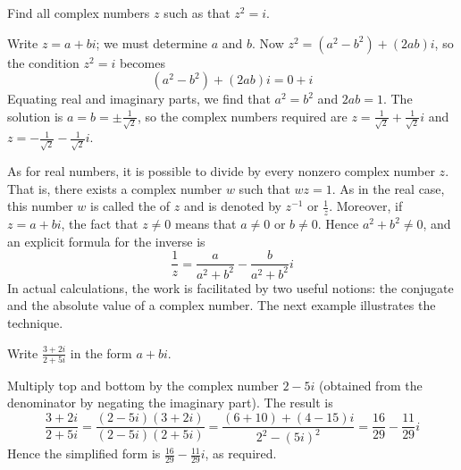 \documentclass{ximera}
\begin{document}
\begin{example}\label{ex:033872}
Find all complex numbers $z$ such as that $z^{2} = i$.

\begin{explanation}
  Write $z = a + bi$; we must determine $a$ and $b$. Now $z^{2} = (a^{2} - b^{2}) + (2ab)i$, so the condition $z^{2} = i$ becomes
\begin{equation*}
(a^2 - b^2) + (2ab)i = 0+i
\end{equation*}
Equating real and imaginary parts, we find that $a^{2} = b^{2}$ and $2ab = 1$. The solution is $a = b = \pm \frac{1}{\sqrt{2}}$, so the complex numbers required are $z = \frac{1}{\sqrt{2}} + \frac{1}{\sqrt{2}}i$  and  $z = -\frac{1}{\sqrt{2}} - \frac{1}{\sqrt{2}}i$.
\end{explanation}
\end{example}

As for real numbers, it is possible to divide by every nonzero complex number $z$. That is, there exists a complex number $w$ such that $wz = 1$. As in the real case, this number $w$ is called the  of $z$ and is denoted by $z^{-1}$ or $\frac{1}{z}$. Moreover, if $z = a + bi$, the fact that $z \neq 0$ means that $a \neq 0$ or $b \neq 0$. Hence $a^{2} + b^{2} \neq 0$, and an explicit formula for the inverse is
\begin{equation*}
\frac{1}{z} = \frac{a}{a^2 + b^2} - \frac{b}{a^2+b^2}{i}
\end{equation*}
In actual calculations, the work is
facilitated by two useful notions: the conjugate and the absolute value
of a complex number. The next example illustrates the technique.

\begin{example}\label{ex:033897}
Write $\frac{3+2i}{2+5i}$ in the form $a + bi$.

\begin{explanation}
  Multiply top and bottom by the complex number $2 - 5i$ (obtained from the denominator by negating the imaginary part). The result is
\begin{equation*}
\frac{3+2i}{2+5i} = \frac{(2-5i)(3+2i)}{(2-5i)(2+5i)} = \frac{(6+10)+(4-15)i}{2^2-(5i)^2} = \frac{16}{29} - \frac{11}{29} i
\end{equation*}
Hence the simplified form is $\frac{16}{29} - \frac{11}{29} i $, as required.
\end{explanation}
\end{example}
\end{document}

